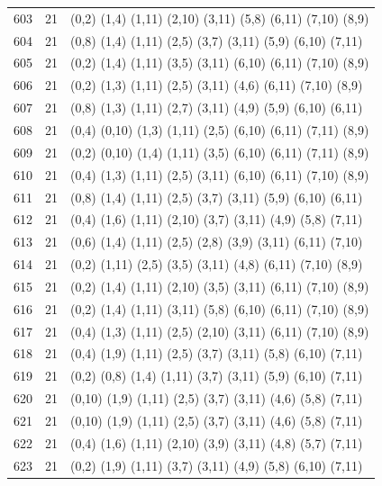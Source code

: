 \begin{appendix}
{\begin{longtable}{lll}
    603& 21 & (0,2)   (1,4)   (1,11)  (2,10)  (3,11)  (5,8)   (6,11)  (7,10)  (8,9)\\
    604& 21 & (0,8)   (1,4)   (1,11)  (2,5)   (3,7)   (3,11)  (5,9)   (6,10)  (7,11)\\
    605& 21 & (0,2)   (1,4)   (1,11)  (3,5)   (3,11)  (6,10)  (6,11)  (7,10)  (8,9)\\
    606& 21 & (0,2)   (1,3)   (1,11)  (2,5)   (3,11)  (4,6)   (6,11)  (7,10)  (8,9)\\
    607& 21 & (0,8)   (1,3)   (1,11)  (2,7)   (3,11)  (4,9)   (5,9)   (6,10)  (6,11)\\
    608& 21 & (0,4)   (0,10)  (1,3)   (1,11)  (2,5)   (6,10)  (6,11)  (7,11)  (8,9)\\
    609& 21 & (0,2)   (0,10)  (1,4)   (1,11)  (3,5)   (6,10)  (6,11)  (7,11)  (8,9)\\
    610& 21 & (0,4)   (1,3)   (1,11)  (2,5)   (3,11)  (6,10)  (6,11)  (7,10)  (8,9)\\
    611& 21 & (0,8)   (1,4)   (1,11)  (2,5)   (3,7)   (3,11)  (5,9)   (6,10)  (6,11)\\
    612& 21 & (0,4)   (1,6)   (1,11)  (2,10)  (3,7)   (3,11)  (4,9)   (5,8)   (7,11)\\
    613& 21 & (0,6)   (1,4)   (1,11)  (2,5)   (2,8)   (3,9)   (3,11)  (6,11)  (7,10)\\
    614& 21 & (0,2)   (1,11)  (2,5)   (3,5)   (3,11)  (4,8)   (6,11)  (7,10)  (8,9)\\
    615& 21 & (0,2)   (1,4)   (1,11)  (2,10)  (3,5)   (3,11)  (6,11)  (7,10)  (8,9)\\
    616& 21 & (0,2)   (1,4)   (1,11)  (3,11)  (5,8)   (6,10)  (6,11)  (7,10)  (8,9)\\
    617& 21 & (0,4)   (1,3)   (1,11)  (2,5)   (2,10)  (3,11)  (6,11)  (7,10)  (8,9)\\
    618& 21 & (0,4)   (1,9)   (1,11)  (2,5)   (3,7)   (3,11)  (5,8)   (6,10)  (7,11)\\
    619& 21 & (0,2)   (0,8)   (1,4)   (1,11)  (3,7)   (3,11)  (5,9)   (6,10)  (7,11)\\
    620& 21 & (0,10)  (1,9)   (1,11)  (2,5)   (3,7)   (3,11)  (4,6)   (5,8)   (7,11)\\
    621& 21 & (0,10)  (1,9)   (1,11)  (2,5)   (3,7)   (3,11)  (4,6)   (5,8)   (7,11)\\
    622& 21 & (0,4)   (1,6)   (1,11)  (2,10)  (3,9)   (3,11)  (4,8)   (5,7)   (7,11)\\
    623& 21 & (0,2)   (1,9)   (1,11)  (3,7)   (3,11)  (4,9)   (5,8)   (6,10)  (7,11)\\

\end{longtable}}
\end{appendix}
